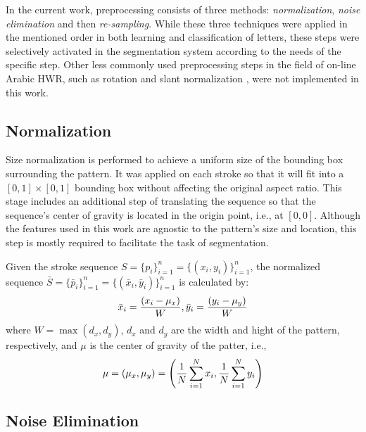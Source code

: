 \iftoggle{edit-mode}{\hspace{0pt}\marginpar{Preprocessing steps usage}}{}
In the current work, preprocessing consists of three methods: \emph{normalization}, \emph{noise elimination} and then \emph{re-sampling}.
While these three techniques were applied in the mentioned order in both learning and classification of letters, these steps were selectively activated in the segmentation system according to the needs of the specific step.
Other less commonly used preprocessing steps in the field of on-line Arabic HWR, such as rotation and slant normalization \cite{jaeger2001online}, were not implemented in this work. 


\subsection{Normalization}
\iftoggle{edit-mode}{\hspace{0pt}\marginpar{Goal}}{}
Size normalization is performed to achieve a uniform size of the bounding box surrounding the pattern. 
It was applied on each stroke so that it will fit into a $[0,1]\times[0,1]$ bounding box without affecting the original aspect ratio. 
This stage includes an additional step of translating the sequence so that the sequence's center of gravity is located in the origin point, i.e., at $[0,0]$.
Although the features used in this work are agnostic to the pattern's size and location, this step is mostly required to facilitate the task of segmentation.

\iftoggle{edit-mode}{\hspace{0pt}\marginpar{Approach}}{}
Given the stroke sequence $S=\{p_i\}_{i=1}^{n}=\{(x_i,y_i)\}_{i=1}^{n}$, the normalized sequence $\bar{S}=\{\bar p_i \}_{i=1}^{n}=\{(\bar x_i,\bar y_i)\}_{i=1}^{n}$ is calculated by: 
\begin{equation}
{\bar x_i} = {{\left( {{x_i} - {\mu _x}} \right)} \over W},{\bar y_i} = {{\left( {{y_i} - {\mu _y}} \right)} \over W}
\end{equation}
where $W = \max (d_x,d_y)$, $d_x$ and $d_y$ are the width and hight of the pattern, respectively, and $\mu$ is the center of gravity of the patter, i.e., 
\begin{equation}
\mu  = \left( {{\mu _x},{\mu _y}} \right) = \left( {{1 \over N}\sum\limits_{i = 1}^N {{x_i}} ,{1 \over N}\sum\limits_{i = 1}^N {{y_i}} } \right)
\end{equation}


\subsection{Noise Elimination}

